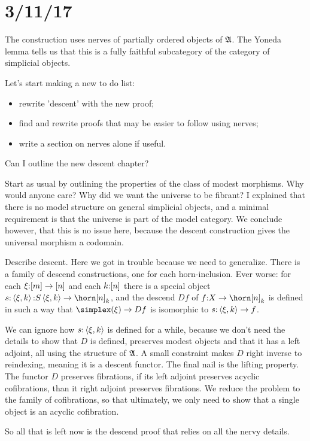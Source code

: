 \documentclass[csh.tex]{subfiles}
\begin{document}
\section{3/11/17}
The construction uses nerves of partially ordered objects of $\mathfrak A$. The Yoneda lemma tells us that this is a fully faithful subcategory of the category of simplicial objects.

Let's start making a new to do list:
\begin{itemize}
\item rewrite 'descent' with the new proof;
\item find and rewrite proofs that may be easier to follow using nerves;
\item write a section on nerves alone if useful.
\end{itemize}

Can I outline the new descent chapter?

Start as usual by outlining the properties of the class of modest morphisms. Why would anyone care? Why did we want the universe to be fibrant?
I explained that there is no model structure on general simplicial objects, and a minimal requirement is that the universe is part of the model category.
We conclude however, that this is no issue here, because the descent construction gives the universal morphism a codomain.

Describe descent. Here we got in trouble because we need to generalize. There is a family of descend constructions, one for each horn-inclusion. Ever worse: for each $\xi\mathord :[m]\to[n]$ and each $k\mathord : [n]$ there is a special object $s\of\tuplet{\xi,k} \of S\tuplet{\xi,k} \to \horn[n]_k$, and the descend $Df$ of $f\of X\to \horn[n]_k$ is defined in such a way that $\simplex(\xi) \to Df$ is isomorphic to $s\mathord :\left\langle \xi,k \right\rangle \to f$.

We can ignore how $s\mathord :\left\langle \xi,k \right\rangle$ is defined for a while, because we don't need the details to show that $D$ is defined, preserves modest objects and that it has a left adjoint, all using the structure of $\mathfrak A$. A small constraint makes $D$ right inverse to reindexing, meaning it is a descent functor. The final nail is the lifting property. The functor $D$ preserves fibrations, if its left adjoint preserves acyclic cofibrations, than it right adjoint preserves fibrations. We reduce the problem to the family of cofibrations, so that ultimately, we only need to show that a single object is an acyclic cofibration.

So all that is left now is the descend proof that relies on all the nervy details. 
\end{document}
